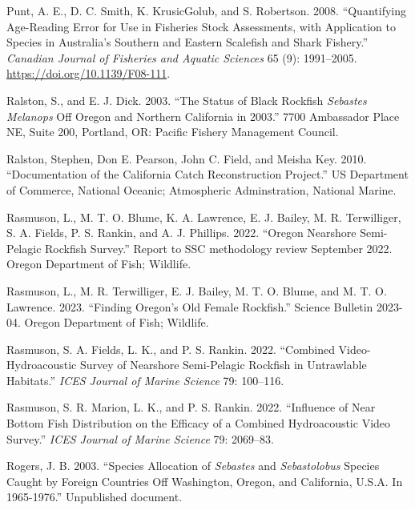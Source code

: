 \documentclass[11pt,
  english,
  letterpaper,
]{article}
\newlength{\cslhangindent}
\newenvironment{CSLReferences}[2] %
 {%
  \setlength{\parindent}{0pt}
  \ifodd #1 \everypar{\setlength{\hangindent}{\cslhangindent}}\ignorespaces\fi
  \ifnum #2 > 0
  \setlength{\parskip}{#2\baselineskip}
  \fi
 }%
 {}
\begin{document}
\begin{CSLReferences}{1}{0}
\leavevmode{}%
Punt, A. E., D. C. Smith, K. KrusicGolub, and S. Robertson. 2008. {``Quantifying Age-Reading Error for Use in Fisheries Stock Assessments, with Application to Species in {A}ustralia's Southern and Eastern Scalefish and Shark Fishery.''} \emph{Canadian Journal of Fisheries and Aquatic Sciences} 65 (9): 1991--2005. \url{https://doi.org/10.1139/F08-111}.

\leavevmode{}%
Ralston, S., and E. J. Dick. 2003. {``The Status of Black Rockfish \emph{{Sebastes} Melanops} Off Oregon and Northern California in 2003.''} 7700 Ambassador Place NE, Suite 200, Portland, OR: Pacific Fishery Management Council.

\leavevmode{}%
Ralston, Stephen, Don E. Pearson, John C. Field, and Meisha Key. 2010. {``Documentation of the {California} Catch Reconstruction Project.''} US Department of Commerce, National Oceanic; Atmospheric Adminstration, National Marine.

\leavevmode{}%
Rasmuson, L., M. T. O. Blume, K. A. Lawrence, E. J. Bailey, M. R. Terwilliger, S. A. Fields, P. S. Rankin, and A. J. Phillips. 2022. {``Oregon Nearshore Semi-Pelagic Rockfish Survey.''} Report to SSC methodology review September 2022. Oregon Department of Fish; Wildlife.

\leavevmode{}%
Rasmuson, L., M. R. Terwilliger, E. J. Bailey, M. T. O. Blume, and M. T. O. Lawrence. 2023. {``Finding Oregon's Old Female Rockfish.''} Science Bulletin 2023-04. Oregon Department of Fish; Wildlife.

\leavevmode{}%
Rasmuson, S. A. Fields, L. K., and P. S. Rankin. 2022. {``Combined Video-Hydroacoustic Survey of Nearshore Semi-Pelagic Rockfish in Untrawlable Habitats.''} \emph{{ICES} Journal of Marine Science} 79: 100--116.

\leavevmode{}%
Rasmuson, S. R. Marion, L. K., and P. S. Rankin. 2022. {``Influence of Near Bottom Fish Distribution on the Efficacy of a Combined Hydroacoustic Video Survey.''} \emph{{ICES} Journal of Marine Science} 79: 2069--83.

\leavevmode{}%
Rogers, J. B. 2003. {``Species Allocation of \emph{{Sebastes}} and \emph{Sebastolobus} Species Caught by Foreign Countries Off {Washington}, {Oregon}, and {California}, {U}.{S}.{A}. In 1965-1976.''} Unpublished document.


\end{CSLReferences}
\end{document}

